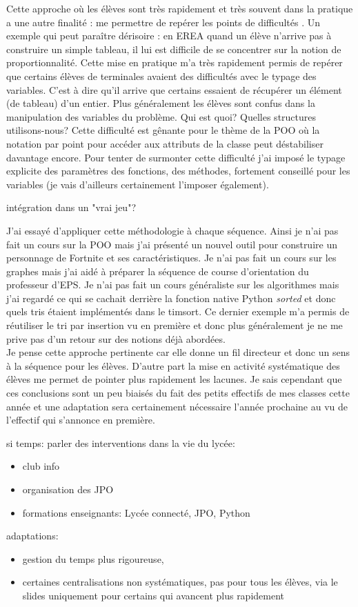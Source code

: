 \documentclass[a4paper,11pt]{article}
\begin{document}
Cette approche où les élèves sont très rapidement et très souvent dans la pratique a une autre finalité : me permettre de repérer les points de difficultés . Un exemple qui peut paraître dérisoire : en EREA quand un élève n'arrive pas à construire un simple tableau, il lui est difficile de se concentrer sur la notion de proportionnalité. Cette mise en pratique  m'a très rapidement permis de repérer que certains élèves de terminales avaient des difficultés avec le typage des variables. C'est à dire qu'il arrive que certains essaient de récupérer un élément (de tableau) d'un entier. Plus généralement les élèves sont confus dans la manipulation des variables du problème. Qui est quoi? Quelles structures utilisons-nous? Cette difficulté est gênante pour le thème de la POO où la notation par point pour accéder aux attributs de la classe peut déstabiliser davantage encore. Pour tenter de surmonter cette difficulté j'ai imposé le typage explicite des paramètres des fonctions, des méthodes, fortement conseillé pour les variables (je vais d'ailleurs certainement l'imposer également).

intégration dans un "vrai jeu"?

J'ai essayé d'appliquer cette méthodologie à chaque séquence. Ainsi je n'ai pas fait un cours sur la POO mais j'ai présenté un nouvel outil pour construire un personnage de Fortnite et ses caractéristiques. Je n'ai pas fait un cours sur les graphes mais j'ai aidé à préparer la séquence de course d'orientation du professeur d'EPS. Je n'ai pas fait un cours généraliste sur les algorithmes  mais j'ai regardé ce qui se cachait derrière la fonction native Python \emph{sorted} et donc quels tris étaient implémentés dans le timsort. Ce dernier exemple m'a permis de réutiliser le tri par insertion vu en première et donc plus généralement je ne me prive pas d'un retour sur des notions déjà abordées.\\
Je pense cette approche pertinente car elle donne un fil directeur et donc un sens à la séquence pour les élèves. D'autre part la mise en activité systématique des élèves me permet de pointer plus rapidement les lacunes. Je sais cependant que ces conclusions sont un peu biaisés du fait des petits effectifs de mes classes cette année et une adaptation sera certainement nécessaire l'année prochaine au vu de l'effectif qui s'annonce en première.

si temps: parler des interventions dans la vie du lycée:
\begin{itemize}
    \item club info
    \item organisation des JPO
    \item formations enseignants: Lycée connecté, JPO, Python
\end{itemize}
adaptations:
\begin{itemize}
    \item gestion du temps plus rigoureuse,
    \item certaines centralisations non systématiques, pas pour tous les élèves, via le slides uniquement pour certains qui avancent plus rapidement
\end{itemize}
\end{document}

